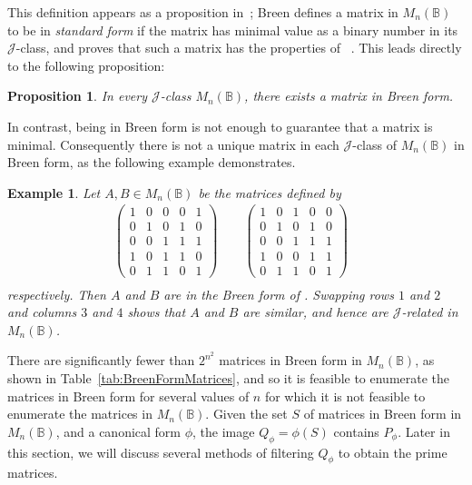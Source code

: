 \documentclass[11pt]{article}
\newtheorem{prop}[thm]{Proposition}
\newtheorem{exa}[thm]{Example}
\newenvironment{ex}{\begin{exa}\rm}{\end{exa}}
\numberwithin{equation}{section}
\newcommand{\B}{\mathbb{B}}
\newcommand{\Bn}{M_n(\B)}
\newcommand{\J}{\mathscr{J}}
\begin{document}
This definition appears as a proposition in~\cite{Breen1997aa}; Breen defines a
matrix in $\Bn$ to be in \emph{standard form} if the matrix has minimal value as
a binary number in its $\J$-class, and proves that such a matrix has the
properties of ~\cite[Proposition 3.6]{Breen1997aa}. This leads
directly to the following proposition:

\begin{prop}
  In every $\J$-class $\Bn$, there exists a matrix in Breen form. 
\end{prop}

In contrast, being in Breen form is not enough to guarantee that a matrix is
minimal. Consequently there is not a unique matrix in each $\J$-class of $\Bn$
in Breen form, as the following example demonstrates. 
\begin{ex}
Let $A, B \in \Bn$ be the matrices defined by
\begin{align*}
  \begin{pmatrix}
    1 & 0 & 0 & 0 & 1 \\
    0 & 1 & 0 & 1 & 0 \\
    0 & 0 & 1 & 1 & 1 \\
    1 & 0 & 1 & 1 & 0 \\
    0 & 1 & 1 & 0 & 1 
  \end{pmatrix}\quad \quad
  \begin{pmatrix}
    1 & 0 & 1 & 0 & 0 \\
    0 & 1 & 0 & 1 & 0 \\
    0 & 0 & 1 & 1 & 1 \\
    1 & 0 & 0 & 1 & 1 \\
    0 & 1 & 1 & 0 & 1 
  \end{pmatrix}&\\
\end{align*}
respectively. Then $A$ and $B$ are in the Breen form of
. Swapping rows $1$ and $2$ and columns $3$
and $4$ shows that $A$ and $B$ are similar, and hence are $\J$-related in $\Bn$.
\end{ex}

There are significantly fewer than $2^{n^2}$ matrices in Breen form in $\Bn$,
as shown in Table~\ref{tab:BreenFormMatrices}, and so it is feasible to
enumerate the matrices in Breen form for several values of $n$ for which it
is not feasible to enumerate the matrices in $\Bn$.
Given the set $S$ of matrices in Breen form in $\Bn$, and a canonical form
$\phi$, the image $Q_\phi = \phi(S)$ contains $P_\phi$. Later in this section,
we will discuss several methods of filtering $Q_\phi$ to obtain the prime
matrices. 
\end{document}

